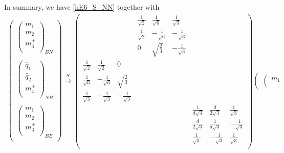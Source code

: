 In summary, we have \eqref{hE6_S_NN} together with 
\begin{align}
\left(\begin{matrix}
\left( \begin{matrix}
{m}_1\\
{m}_2\\
m_3^+\\
\end{matrix} \right)_{BN} \\
\\
\left( \begin{matrix}
\widehat{{q}}_1\\
\widehat{{q}}_2\\
m_4^+\\
\end{matrix} \right)_{NB}\\
\\
\left( \begin{matrix}
{m}_1\\
{m}_2\\
m_3^+\\
\end{matrix} \right)_{BB} \\
\end{matrix} \right)
\xrightarrow{S} \left( \begin{matrix}
&&&			\frac{1}{\sqrt{2}} & \frac{1}{\sqrt{6}} &  \frac{1}{\sqrt{3}} &			&&\\
&&&			\frac{1}{\sqrt{2}} & - \frac{1}{\sqrt{6}} & -\frac{1}{\sqrt{3}}& 			&&\\
&&&			0& \sqrt{\frac{2}{3}} & -\frac{1}{\sqrt{3}}& 			&&\\
\frac{1}{\sqrt{2}}& \frac{1}{\sqrt{2}}& 0&			&&& 			&&\\
\frac{1}{\sqrt{6}} & - \frac{1}{\sqrt{6}} & \sqrt{\frac{2}{3}}&			&&& 			&&\\
\frac{1}{\sqrt{3}} & - \frac{1}{\sqrt{3}} & - \frac{1}{\sqrt{3}}&			&&& 			&&\\
&&&			&&&			\frac{1}{d\sqrt{3}} & \frac{d}{2\sqrt{3}} & \frac{1}{\sqrt{3}}\\
&&&			&&& 			\frac{d}{2\sqrt{3}} & \frac{1}{d\sqrt{3}} & -\frac{1}{\sqrt{3}}\\
&&&			&&& 			\frac{1}{\sqrt{3}} & -\frac{1}{\sqrt{3}} & \frac{1}{\sqrt{3}}\\
\end{matrix} \right)
\left(\begin{matrix}
\left( \begin{matrix}
{m}_1\\

\end{matrix}
\end{matrix}
\end{align}
